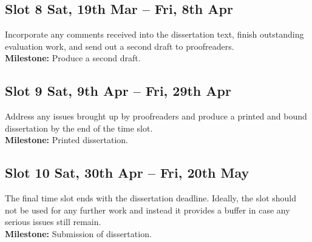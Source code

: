 \documentclass[a4paper,12pt]{scrbook}
\theoremstyle{plain}
\theoremstyle{definition}
\begin{document}
\subsection*{Slot 8 \hfill {\small Sat, 19th Mar -- Fri, 8th Apr}}
Incorporate any comments received into the dissertation text, finish outstanding evaluation work, and send out a second draft to proofreaders.
\\
{\bfseries Milestone:} Produce a second draft.

\subsection*{Slot 9 \hfill {\small Sat, 9th Apr -- Fri, 29th Apr}}
Address any issues brought up by proofreaders and produce a printed and bound dissertation by the end of the time slot.
\\
{\bfseries Milestone:} Printed dissertation.

\subsection*{Slot 10 \hfill {\small Sat, 30th Apr -- Fri, 20th May}}
The final time slot ends with the dissertation deadline. Ideally, the slot should not be used for any further work and instead it provides a buffer in case any serious issues still remain.
\\
{\bfseries Milestone:} Submission of dissertation.


\end{document}
